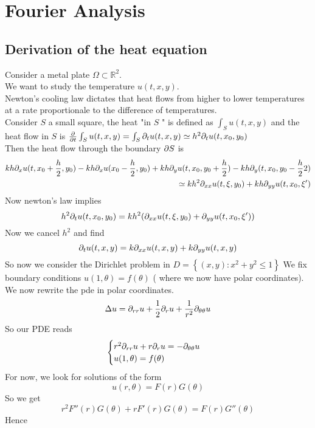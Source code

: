 \documentclass[../main.tex]{subfiles}
\begin{document}
\section{Fourier Analysis}
\subsection{Derivation of the heat equation}
Consider a metal plate $\Omega \subset \mathbb{R}^{2}$.\\
We want to study the temperature $u( t,x,y) $.\\
Newton's cooling law dictates that heat flows from higher to lower temperatures at a rate proportionale to the difference of temperatures.\\
Consider $S$  a small square, the heat "in $S$ " is defined as $ \int_{ S }^{  } u( t,x,y) $ and the heat flow in $S$ is $ \frac{\partial}{\partial t} \int_{ S }^{  }u( t,x,y) = \int_{ S }^{  } \partial_t u( t,x,y) \simeq h^{2} \partial_t u( t,x_0,y_0) $ \\
Then the heat flow through the boundary $\partial S$ is 
\begin{align*}
k h\partial_x u( t,x_0+ \frac{h}{2}, y_0) - kh \partial_x u( x_0-\frac{h}{2}, y_0) + k h \partial_{y} u( t,x_0, y_0+\frac{h}{2})  - kh \partial_y( t,x_0,y_0-\frac{h}{2}2)\\
\simeq kh^{2} \partial_{xx  } u( t,\xi,y_0) + kh \partial_{yy} u( t,x_0,\xi')
\end{align*}
Now newton's law implies
\[ 
h^{2} \partial_t u( t,x_0,y_{0}) = kh^{2} ( \partial_{xx} u( t,\xi,y_0) + \partial_{yy} u( t,x_0,\xi') )  
\]
Now we cancel $h^{2}$ and find
\[ 
\partial_t u( t,x,y)  = k \partial_{xx} u( t,x,y) + k\partial_{yy} u( t,x,y) 
\]
So now we consider the Dirichlet problem in $D= \left\{ ( x,y) : x^{2} + y^{2} \leq 1\right\} $ 
We fix boundary conditions $u( 1,\theta) = f( \theta) $ ( where we now have polar coordinates).\\
We now rewrite the pde in polar coordinates.
\[ 
\Delta u = \partial_{rr} u + \frac{1}{2}\partial_r u + \frac{1}{r^{2}}\partial_{\theta\theta} u
\]
So our PDE reads 
\begin{align*}
\begin{cases}
r^{2}\partial_{rr} u + r \partial_r u = - \partial_{\theta\theta} u\\
u( 1,\theta) = f( \theta) 
\end{cases}
\end{align*}
For now, we look for solutions of the form
\[ 
u( r,\theta) = F( r) G( \theta) 
\]
So we get
\[ 
r^{2}F''(r)G( \theta)  + r F'( r) G( \theta) = F( r) G''( \theta) 
\]
Hence
\end{document}
